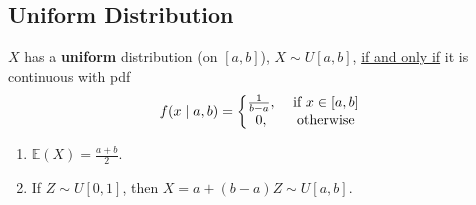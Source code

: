 \documentclass[11pt]{elegantbook}
\begin{document}
\subsection{Uniform Distribution}
\begin{definition}
    \normalfont
    $X$ has a \textbf{uniform} distribution (on $[a,b]$), $X\sim U[a,b]$, \underline{if and only if} it is continuous with pdf
    \begin{equation}
        \begin{aligned}
            f(x\mid a,b)=\left\{\begin{matrix}
                \frac{1}{b-a},& \textnormal{ if }x\in [a,b]\\
                0,& \textnormal{ otherwise}
            \end{matrix}\right.
        \end{aligned}
        \nonumber
    \end{equation}
\end{definition}
\begin{enumerate}[$\circ$]
    \item $\mathbb{E}(X)=\frac{a+b}{2}$.
    \item If $Z\sim U[0,1]$, then $X=a+(b-a)Z\sim U[a,b]$.
\end{enumerate}
\end{document}
